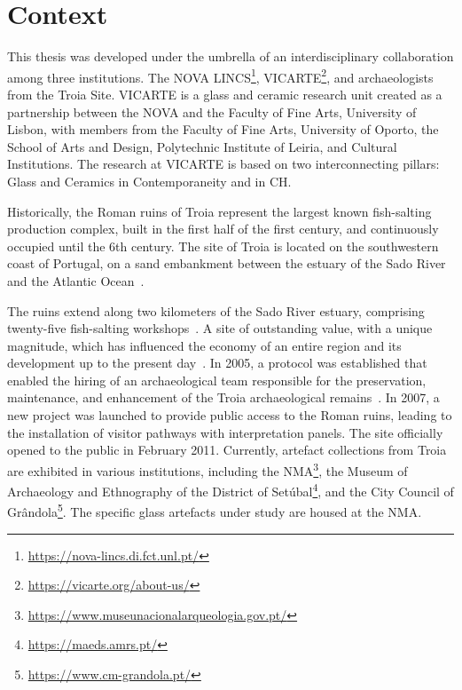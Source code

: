 \section{Context}
\label{sec:context}

This thesis was developed under the umbrella of an interdisciplinary collaboration among three institutions.
The NOVA LINCS\footnote{\url{https://nova-lincs.di.fct.unl.pt/}}, \gls{VICARTE}\footnote{\url{https://vicarte.org/about-us/}}, and archaeologists from the Troia Site.
\gls{VICARTE} is a glass and ceramic research unit created as a partnership between the \gls{NOVA} and the Faculty of Fine Arts, University of Lisbon, with members from the Faculty of Fine Arts, University of Oporto, the School of Arts and Design, Polytechnic Institute of Leiria, and Cultural Institutions.
The research at \gls{VICARTE} is based on two interconnecting pillars: Glass and Ceramics in Contemporaneity and in \gls{CH}. 

Historically, the Roman ruins of Troia represent the largest known fish-salting production complex, built in the first half of the first century, and continuously occupied until the 6th century. 
The site of Troia is located on the southwestern coast of Portugal, on a sand embankment between the estuary of the Sado River and the Atlantic Ocean~\cite{pinto2018reassessment}.

The ruins extend along two kilometers of the Sado River estuary, comprising twenty-five fish-salting workshops~\cite{hocquet2015fish}.
A site of outstanding value, with a unique magnitude, which has influenced the economy of an entire region and its development up to the present day~\cite{unesco_troia}.
In 2005, a protocol was established that enabled the hiring of an archaeological team responsible for the preservation, maintenance, and enhancement of the Troia archaeological remains~\cite{pinto2014ruinas}. In 2007,
a new project was launched to provide public access to the Roman ruins, leading to the installation of visitor pathways with interpretation panels. The site officially opened to the public in February 2011. 
Currently, artefact collections from Troia are exhibited in various institutions, including the \gls{NMA}\footnote{\url{https://www.museunacionalarqueologia.gov.pt/}}, the Museum of Archaeology and Ethnography of the District of Setúbal\footnote{\url{https://maeds.amrs.pt/}}, and the City Council of Grândola\footnote{\url{https://www.cm-grandola.pt/}}. The specific glass artefacts under study are housed at the \gls{NMA}.



